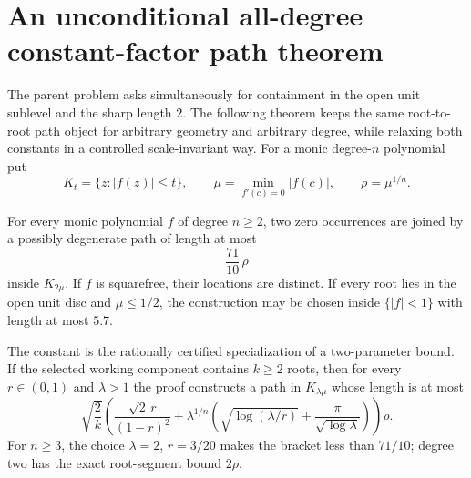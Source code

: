 \section{An unconditional all-degree constant-factor path theorem}
\label{sec:constant-factor}

The parent problem asks simultaneously for containment in the open unit
sublevel and the sharp length $2$.  The following theorem keeps the same
root-to-root path object for arbitrary geometry and arbitrary degree, while
relaxing both constants in a controlled scale-invariant way.  For a monic
degree-$n$ polynomial put
\[
 K_t=\{z:|f(z)|\le t\},\qquad
 \mu=\min_{f'(c)=0}|f(c)|,\qquad \rho=\mu^{1/n}.
\]

\begin{theorem}
\label{res:constant-factor-path}
For every monic polynomial $f$ of degree $n\ge2$, two zero occurrences are
joined by a possibly degenerate path of length at most
\[
 \frac{71}{10}\,\rho
\]
inside $K_{2\mu}$.  If $f$ is squarefree, their locations are distinct.
If every root lies in the open unit disc and $\mu\le1/2$, the construction
may be chosen inside $\{|f|<1\}$ with length at most $5.7$.
\end{theorem}

The constant is the rationally certified specialization of a two-parameter
bound.  If the selected working component contains $k\ge2$ roots, then for
every $r\in(0,1)$ and $\lambda>1$ the proof constructs a path in
$K_{\lambda\mu}$ whose length is at most
\[
 \sqrt{\frac2k}\left(
   \frac{\sqrt2\,r}{(1-r)^2}
   +\lambda^{1/n}\left(
      \sqrt{\log(\lambda/r)}+
      \frac{\pi}{\sqrt{\log\lambda}}
    \right)
 \right)\rho.                                      \tag{CF}
\]
For $n\ge3$, the choice $\lambda=2$, $r=3/20$ makes the bracket less
than $71/10$; degree two has the exact root-segment bound $2\rho$.

